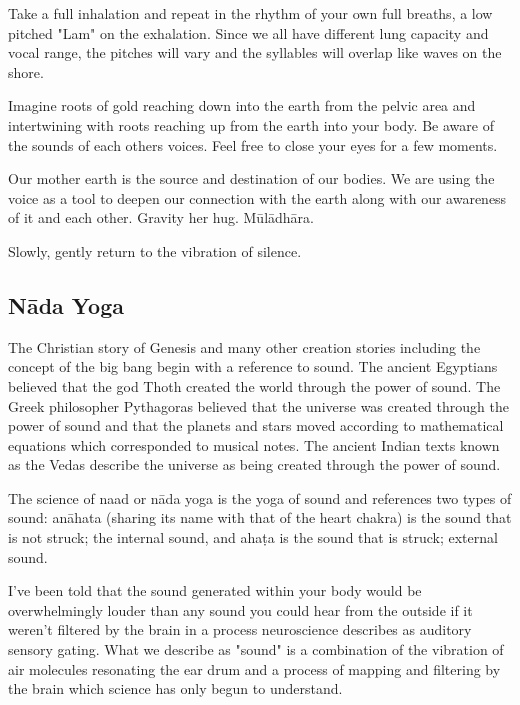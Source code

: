 \documentclass[12pt]{article}
\begin{document}
Take a full inhalation and repeat in the rhythm of your own full breaths, a low pitched "Lam" on the exhalation. Since we all have different lung capacity and vocal range, the pitches will vary and the syllables will overlap like waves on the shore.

Imagine roots of gold reaching down into the earth from the pelvic area and intertwining with roots reaching up from the earth into your body. Be aware of the sounds of each others voices. Feel free to close your eyes for a few moments.

Our mother earth is the source and destination of our bodies. We are using the voice as a tool to deepen our connection with the earth along with our awareness of it and each other. Gravity her hug. Mūlādhāra.

Slowly, gently return to the vibration of silence.

\subsection*{Nāda Yoga}

The Christian story of Genesis and many other creation stories including the concept of the big bang begin with a reference to sound. The ancient Egyptians believed that the god Thoth created the world through the power of sound. The Greek philosopher Pythagoras believed that the universe was created through the power of sound and that the planets and stars moved according to mathematical equations which corresponded to musical notes. The ancient Indian texts known as the Vedas describe the universe as being created through the power of sound.

The science of naad or nāda yoga is the yoga of sound and references two types of sound: anāhata (sharing its name with that of the heart chakra) is the sound that is not struck; the internal sound, and ahaṭa is the sound that is struck; external sound.



I've been told that the sound generated within your body would be overwhelmingly louder than any sound you could hear from the outside if it weren't filtered by the brain in a process neuroscience describes as auditory sensory gating. What we describe as "sound" is a combination of the vibration of air molecules resonating the ear drum and a process of mapping and filtering by the brain which science has only begun to understand.
\end{document}
